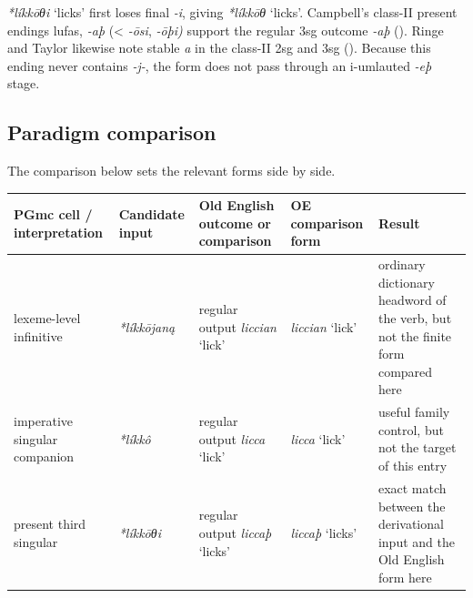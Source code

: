 \documentclass[
  british,
  a4paper,
  openany]{book}
\newcounter{none} %
\providecommand{\Recon}[1]{\emph{*#1}}
{\catcode`→=\active \global\def→{\ensuremath{\rightarrow}}}
\providecommand{\Recon}[1]{\emph{*#1}}
{\catcode`→=\active \global\def→{\ensuremath{\rightarrow}}}
\begin{document}
{\Recon{líkkōθi} `licks'} first loses final \emph{-i}, giving
\Recon{líkkōθ} `licks'. Campbell's class-II present endings lufas,
\emph{-aþ} (\textless{} \emph{-ōsi}, \emph{-ōþi)} support the regular
3sg outcome \emph{-aþ} (). Ringe and Taylor likewise note stable \emph{a} in the class-II
2sg and 3sg ().
Because this ending never contains \emph{-j-}, the form does not pass
through an i-umlauted \emph{-eþ} stage.

\subsection{Paradigm comparison}\label{paradigm-comparison-25}

The comparison below sets the relevant forms side by side.

{\def\LTcaptype{none} %
\begin{longtable}[]{@{}
  >{\raggedright\arraybackslash}p{}
  >{\raggedright\arraybackslash}p{}
  >{\raggedright\arraybackslash}p{}
  >{\raggedright\arraybackslash}p{}
  >{\raggedright\arraybackslash}p{}@{}}
\toprule\noalign{}
\begin{minipage}[b]{\linewidth}\raggedright
PGmc cell / interpretation
\end{minipage} & \begin{minipage}[b]{\linewidth}\raggedright
Candidate input
\end{minipage} & \begin{minipage}[b]{\linewidth}\raggedright
Old English outcome or comparison
\end{minipage} & \begin{minipage}[b]{\linewidth}\raggedright
OE comparison form
\end{minipage} & \begin{minipage}[b]{\linewidth}\raggedright
Result
\end{minipage} \\
\midrule\noalign{}
\endhead
\bottomrule\noalign{}
\endlastfoot
lexeme-level infinitive & {\emph{*líkkōjaną}} & regular output
{\emph{liccian}} `lick' & {\emph{liccian}} `lick' & ordinary dictionary
headword of the verb, but not the finite form compared here \\
imperative singular companion & {\emph{*líkkô}} & regular output
{\emph{licca}} `lick' & {\emph{licca}} `lick' & useful family control,
but not the target of this entry \\
present third singular & {\emph{*líkkōθi}} & regular output
{\emph{liccaþ}} `licks' & {\emph{liccaþ}} `licks' & exact match between
the derivational input and the Old English form here \\
\end{longtable}
}
\end{document}
